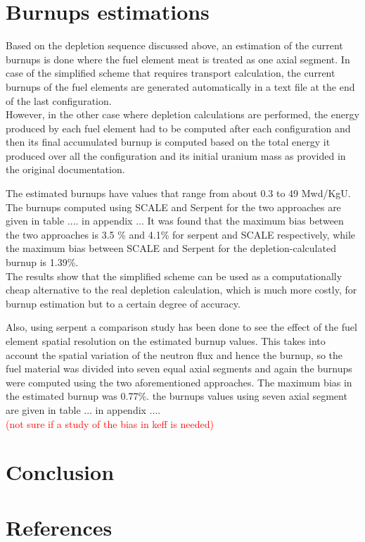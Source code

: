 \documentclass[review,number,sort&compress,12pt]{elsarticle}
\begin{document}
\section{Burnups estimations}
Based on the depletion sequence discussed above, an estimation of the current burnups is done where the fuel element meat is treated as one axial segment.
In case of the simplified scheme that requires transport calculation, the current burnups of the fuel elements are generated automatically in a text file at the end of the last configuration.\\
However, in the other case where depletion calculations are performed, the energy produced by each fuel element had to be computed after each configuration and then its final accumulated burnup is computed based on the total energy it produced over all the configuration and its initial uranium mass as provided in the original documentation.

The estimated burnups have values that range from about 0.3 to 49 Mwd/KgU. The burnups computed using SCALE and Serpent for the two approaches are given in table .... in appendix ...
It was found that the maximum bias between the two approaches is 3.5 \% and 4.1\% for serpent and SCALE respectively, while the maximum bias between SCALE and Serpent for the depletion-calculated burnup is 1.39\%.\\
The results show that the simplified scheme can be used as a computationally cheap alternative to the real depletion calculation, which is much more costly, for burnup estimation but to a certain degree of accuracy.

Also, using serpent a comparison study has been done to see the effect of the fuel element spatial resolution on the estimated burnup values. This takes into account the spatial variation of the neutron flux and hence the burnup, so the fuel material was divided into seven equal axial segments and again the burnups were computed using the two aforementioned approaches. 
The maximum bias in the estimated burnup was 0.77\%. the burnups values using seven axial segment are given in table ... in appendix ....\\ 
\textcolor{red}{(not sure if a study of the bias in keff is needed)}


\section{Conclusion}

\section*{References}

 

\end{document}
